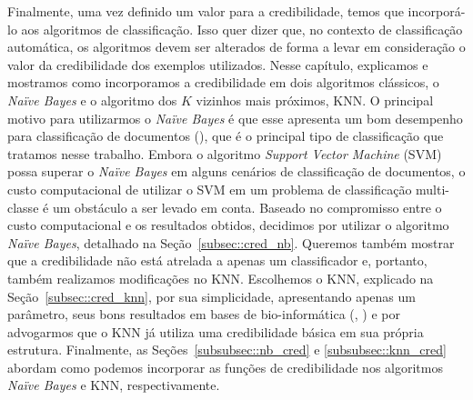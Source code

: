 

Finalmente, uma vez definido um valor para a credibilidade, temos que incorporá-lo aos algoritmos de classificação. Isso quer dizer que, no contexto de classificação automática, os algoritmos devem ser alterados de forma a levar em consideração o valor da credibilidade dos exemplos utilizados. Nesse capítulo, explicamos e mostramos como incorporamos a credibilidade em dois algoritmos clássicos, o \textit{Naïve Bayes} e o algoritmo dos $K$ vizinhos mais próximos, \textsc{KNN}. O principal motivo para utilizarmos o \textit{Naïve Bayes} é que esse apresenta um bom desempenho  para classificação de documentos (\cite{Salles10}), que é o principal tipo de classificação que tratamos nesse trabalho. Embora o algoritmo \textit{Support Vector Machine} (\textsc{SVM}) possa superar o \textit{Naïve Bayes} em alguns cenários de classificação de documentos, o custo computacional de utilizar o \textsc{SVM} em um problema de classificação multi-classe é um obstáculo a ser levado em conta. Baseado no compromisso entre o custo computacional e os resultados obtidos, decidimos por utilizar o algoritmo \textit{Naïve Bayes}, detalhado na Seção~\ref{subsec::cred_nb}. Queremos também mostrar que a credibilidade não está atrelada a apenas um classificador e, portanto, também realizamos modificações no \textsc{KNN}. Escolhemos o \textsc{KNN}, explicado na Seção~\ref{subsec::cred_knn}, por sua simplicidade, apresentando apenas um parâmetro, seus bons resultados em bases de bio-informática (\cite{Li04}, \cite{Yeang01}) e por advogarmos que o \textsc{KNN} já utiliza uma credibilidade básica em sua própria estrutura. Finalmente, as Seções~\ref{subsubsec::nb_cred} e \ref{subsubsec::knn_cred} abordam como podemos incorporar as funções de credibilidade nos algoritmos \textit{Naïve Bayes} e \textsc{KNN}, respectivamente.



